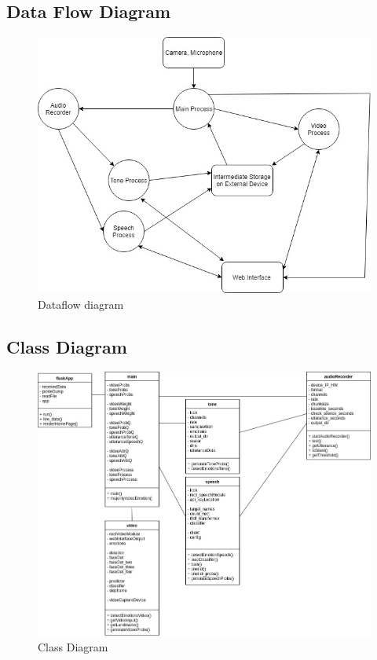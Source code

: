 \documentclass[oneside,a4paper,12pt]{report}
\begin{document}
\begin{normalsize}
\subsection{Data Flow Diagram}   
\begin{center}
	\begin{figure}[!htbp]
		\centering
		\includegraphics[width=\textwidth]{dataflow_proj.jpg}
		\caption{Dataflow diagram}
		\label{fig:dataflowdiag}
	\end{figure}
\end{center}  
\newpage

\subsection{Class Diagram}
\begin{center}
	\begin{figure}[!htbp]
		\centering
		\includegraphics[width=450pt]{classDiagramProject.jpg}
		\caption{Class Diagram}
		\label{fig:class-dig}
	\end{figure}
\end{center} 


\end{normalsize}
\end{document}
